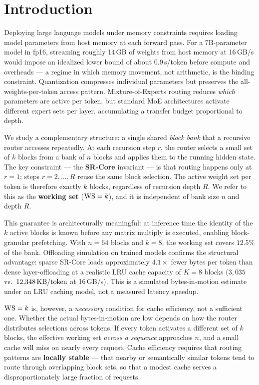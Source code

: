 \section{Introduction}
\label{sec:intro}

Deploying large language models under memory constraints requires loading model parameters
from host memory at each forward pass.
For a 7B-parameter model in fp16, streaming roughly 14\,GB of weights from host memory at
16\,GB/s would impose an idealized lower bound of about 0.9\,s/token before compute and
overheads --- a regime in which memory movement, not arithmetic, is the binding constraint.
Quantization compresses individual parameters but preserves the all-weights-per-token access
pattern.
Mixture-of-Experts routing \citep{shazeer2017moe,fedus2022switch} reduces \emph{which}
parameters are active per token, but standard MoE architectures activate different expert
sets per layer, accumulating a transfer budget proportional to depth.

We study a complementary structure: a single shared \emph{block bank} that a recursive
router accesses repeatedly.
At each recursion step $r$, the router selects a small set of $k$ blocks from a bank of $n$
blocks and applies them to the running hidden state.
The key constraint --- the \textbf{SR-Core} invariant --- is that routing happens only at
$r = 1$; steps $r = 2, \ldots, R$ reuse the same block selection.
The active weight set per token is therefore exactly $k$ blocks, regardless of recursion
depth $R$.
We refer to this as the \textbf{working set} ($\mathrm{WS} = k$), and it is independent of bank
size $n$ and depth $R$.

This guarantee is architecturally meaningful: at inference time the identity of the $k$
active blocks is known before any matrix multiply is executed, enabling block-granular
prefetching.
With $n = 64$ blocks and $k = 8$, the working set covers $12.5\%$ of the bank.
Offloading simulation on trained models confirms the structural advantage: sparse SR-Core
loads approximately $4.1\times$ fewer bytes per token than dense layer-offloading at a
realistic LRU cache capacity of $K = 8$ blocks ($3{,}035$ vs.\ $12{,}348\,\text{KB/token}$ at 16\,GB/s).
This is a simulated bytes-in-motion estimate under an LRU caching model, not a measured
latency speedup.

$\mathrm{WS} = k$ is, however, a \emph{necessary} condition for cache efficiency, not a sufficient
one.
Whether the actual bytes-in-motion are low depends on how the router distributes selections
across tokens.
If every token activates a different set of $k$ blocks, the effective working set
\emph{across a sequence} approaches $n$, and a small cache will miss on nearly every
request.
Cache efficiency requires that routing patterns are \textbf{locally stable} --- that nearby
or semantically similar tokens tend to route through overlapping block sets, so that a
modest cache serves a disproportionately large fraction of requests.

